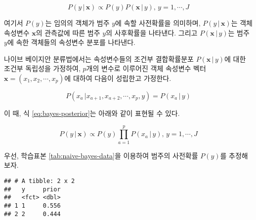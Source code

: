 \documentclass[]{book}
\newenvironment{Shaded}{\begin{snugshade}}{\end{snugshade}}
\newcommand{\DataTypeTok}[1]{\textcolor[rgb]{0.13,0.29,0.53}{#1}}
\newcommand{\KeywordTok}[1]{\textcolor[rgb]{0.13,0.29,0.53}{\textbf{#1}}}
\newcommand{\NormalTok}[1]{#1}
\newcommand{\OperatorTok}[1]{\textcolor[rgb]{0.81,0.36,0.00}{\textbf{#1}}}
\newcommand{\StringTok}[1]{\textcolor[rgb]{0.31,0.60,0.02}{#1}}
\begin{document}
\begin{equation}
P(y \, | \, \mathbf{x}) \propto P(y) P(\mathbf{x} \, | \, y), \, y = 1, \cdots, J \label{eq:bayes-posterior}
\end{equation}

여기서 \(P(y)\)는 임의의 객체가 범주 \(y\)에 속할 사전확률을 의미하며, \(P(y \, | \, \mathbf{x})\)는 객체 속성변수 \(\mathbf{x}\)의 관측값에 따른 범주 \(y\)의 사후확률을 나타낸다. 그리고 \(P(\mathbf{x} \, | \, y)\)는 범주 \(y\)에 속한 객체들의 속성변수 분포를 나타낸다.

나이브 베이지안 분류법에서는 속성변수들의 조건부 결합확률분포 \(P(\mathbf{x} \, | \, y)\)에 대한 조건부 독립성을 가정하여, \(p\)개의 변수로 이루어진 객체 속성변수 벡터 \(\mathbf{x} = (x_1, x_2, \cdots, x_p)\)에 대하여 다음이 성립한고 가정한다.

\begin{equation*}
P(x_a \, | x_{a + 1}, x_{a + 2}, \cdots, x_p, y) = P(x_a \,|\, y)
\end{equation*}

이 때, 식 \eqref{eq:bayes-posterior}는 아래와 같이 표현될 수 있다.

\begin{equation}
P(y \, | \, \mathbf{x}) \propto P(y) \prod_{a = 1}^{p} P(x_a \, | \, y), \, y = 1, \cdots, J \label{eq:naive-bayes-posterior}
\end{equation}

우선, 학습표본 \ref{tab:naive-bayes-data}을 이용하여 범주의 사전확률 \(P(y)\)를 추정해보자.

\begin{Shaded}
\end{Shaded}

\begin{verbatim}
## # A tibble: 2 x 2
##   y     prior
##   <fct> <dbl>
## 1 1     0.556
## 2 2     0.444
\end{verbatim}
\end{document}

